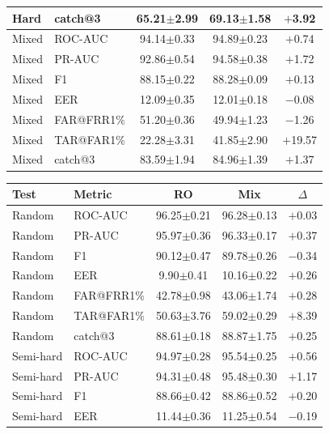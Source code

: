 \documentclass[11pt]{article}
\begin{document}
\begin{table}[!t]
\begin{minipage}[t]{0.48\textwidth}
\begin{tabular}{l l c c c}
Hard      & catch@3    & 65.21$\pm$2.99 & 69.13$\pm$1.58 & $+$3.92 \\
\midrule
Mixed     & ROC-AUC    & 94.14$\pm$0.33 & 94.89$\pm$0.23 & $+$0.74 \\
Mixed     & PR-AUC     & 92.86$\pm$0.54 & 94.58$\pm$0.38 & $+$1.72 \\
Mixed     & F1         & 88.15$\pm$0.22 & 88.28$\pm$0.09 & $+$0.13 \\
Mixed     & EER        & 12.09$\pm$0.35 & 12.01$\pm$0.18 & $-$0.08 \\
Mixed     & FAR@FRR1\% & 51.20$\pm$0.36 & 49.94$\pm$1.23 & $-$1.26 \\
Mixed     & TAR@FAR1\% & 22.28$\pm$3.31 & 41.85$\pm$2.90 & $+$19.57 \\
Mixed     & catch@3    & 83.59$\pm$1.94 & 84.96$\pm$1.39 & $+$1.37 \\
\bottomrule
\end{tabular}
\label{tab:app_wc_distilbert}
\end{minipage}%
\hfill
\begin{minipage}[t]{0.48\textwidth}
\centering
\begin{tabular}{l l c c c}
\toprule
\textbf{Test} & \textbf{Metric} & \textbf{RO} & \textbf{Mix} & \textbf{$\Delta$} \\
\midrule
Random    & ROC-AUC    & 96.25$\pm$0.21 & 96.28$\pm$0.13 & $+$0.03 \\
Random    & PR-AUC     & 95.97$\pm$0.36 & 96.33$\pm$0.17 & $+$0.37 \\
Random    & F1         & 90.12$\pm$0.47 & 89.78$\pm$0.26 & $-$0.34 \\
Random    & EER        & \phantom{0}9.90$\pm$0.41 & 10.16$\pm$0.22 & $+$0.26 \\
Random    & FAR@FRR1\% & 42.78$\pm$0.98 & 43.06$\pm$1.74 & $+$0.28 \\
Random    & TAR@FAR1\% & 50.63$\pm$3.76 & 59.02$\pm$0.29 & $+$8.39 \\
Random    & catch@3    & 88.61$\pm$0.18 & 88.87$\pm$1.75 & $+$0.25 \\
\midrule
Semi-hard & ROC-AUC    & 94.97$\pm$0.28 & 95.54$\pm$0.25 & $+$0.56 \\
Semi-hard & PR-AUC     & 94.31$\pm$0.48 & 95.48$\pm$0.30 & $+$1.17 \\
Semi-hard & F1         & 88.66$\pm$0.42 & 88.86$\pm$0.52 & $+$0.20 \\
Semi-hard & EER        & 11.44$\pm$0.36 & 11.25$\pm$0.54 & $-$0.19 \\

\end{tabular}
\end{minipage}
\end{table}
\end{document}
